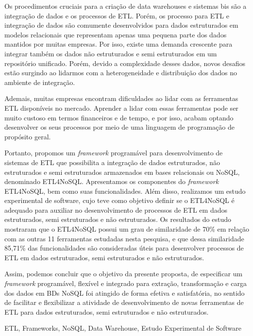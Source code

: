 
Os procedimentos cruciais para a criação de data warehouses e sistemas \acp{bi} são a integração de dados e os processos de ETL. Porém, os processo para ETL e integração de dados são comumente desenvolvidos para dados estruturados em modelos relacionais que representam apenas uma pequena parte dos dados mantidos por muitas empresas. Por isso, existe uma demanda crescente para integrar também os dados não estruturados e semi estruturados em um repositório unificado. Porém, devido a complexidade desses dados, novos desafios estão surgindo ao lidarmos com a heterogeneidade e distribuição dos dados no ambiente de integração.

Ademais, muitas empresas encontram dificuldades ao lidar com as ferramentas ETL disponíveis no mercado. Aprender a lidar com essas ferramentas pode ser muito custoso em termos financeiros e de tempo, e por isso, acabam optando desenvolver os seus processos por meio de uma linguagem de programação de propósito geral.

Portanto, propomos um \textit{framework} programável para desenvolvimento de sistemas de ETL que possibilita a integração de dados estruturados, não estruturados e semi estruturados armazenados em bases relacionais ou NoSQL, denominado ETL4NoSQL. Apresentamos os componentes do \textit{framework} ETL4NoSQL, bem como suas funcionalidades. Além disso, realizamos um estudo experimental de software, cujo teve como objetivo definir se o ETL4NoSQL é adequado para auxiliar no desenvolvimento de processos de ETL em dados estruturados, semi estruturados e não estruturados. Os resultados do estudo mostraram que o ETL4NoSQL possui um grau de similaridade de 70\% em relação com as outras 11 ferramentas estudadas nesta pesquisa, e que dessa similaridade 85,71\% das funcionalidades são consideradas úteis para desenvolver processos de ETL em dados estruturados, semi estruturados e não estruturados. 

Assim, podemos concluir que o objetivo da presente proposta, de especificar um \textit{framework} programável, flexível e integrado para extração, transformação e carga dos dados em BDs NoSQL foi atingido de forma efetiva e satisfatória, no sentido de facilitar e flexibilizar a atividade de desenvolvimento de novas ferramentas de ETL para dados estruturados, semi estruturados e não estruturados.

\begin{keywords}
ETL, Frameworks, NoSQL, Data Warehouse, Estudo Experimental de Software
\end{keywords}